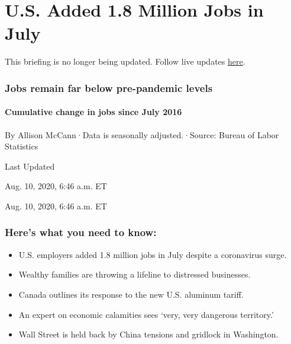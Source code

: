 \hypertarget{us-added-18-million-jobs-in-july}{%
\section{U.S. Added 1.8 Million Jobs in
July}\label{us-added-18-million-jobs-in-july}}

This briefing is no longer being updated. Follow live updates
\href{https://www.nytimes3xbfgragh.onion/live/2020/08/10/business/stock-market-today-coronavirus}{here}.

\hypertarget{jobs-remain-far-below-pre-pandemic-levels}{%
\subsubsection{Jobs remain far below pre-pandemic
levels}\label{jobs-remain-far-below-pre-pandemic-levels}}

\hypertarget{cumulative-change-in-jobs-since-july-2016}{%
\paragraph{Cumulative change in jobs since July
2016}\label{cumulative-change-in-jobs-since-july-2016}}

By Allison McCann·Data is seasonally adjusted.·Source: Bureau of Labor
Statistics

Last Updated

Aug. 10, 2020, 6:46 a.m. ET

Aug. 10, 2020, 6:46 a.m. ET

\hypertarget{heres-what-you-need-to-know}{%
\subsubsection{Here's what you need to
know:}\label{heres-what-you-need-to-know}}

\begin{itemize}
\item
  \protect\hyperlink{us-employers-added-1-8-million-jobs-in-july-despite-a-coronavirus-surge}{}

  U.S. employers added 1.8 million jobs in July despite a coronavirus
  surge.
\item
  \protect\hyperlink{wealthy-families-are-throwing-a-lifeline-to-distressed-businesses}{}

  Wealthy families are throwing a lifeline to distressed businesses.
\item
  \protect\hyperlink{canada-outlines-its-response-to-the-new-us-aluminum-tariff}{}

  Canada outlines its response to the new U.S. aluminum tariff.
\item
  \protect\hyperlink{an-expert-on-economic-calamities-sees-very-very-dangerous-territory}{}

  An expert on economic calamities sees `very, very dangerous
  territory.'
\item
  \protect\hyperlink{wall-street-is-held-back-by-china-tensions-and-gridlock-in-washington}{}

  Wall Street is held back by China tensions and gridlock in Washington.
\end{itemize}

